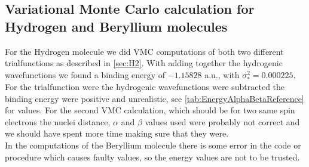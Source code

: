 
\subsection{Variational Monte Carlo calculation for Hydrogen and Beryllium molecules}
	For the Hydrogen molecule we did VMC computations of both two different trialfunctions as described in \cref{sec:H2}. With adding together the hydrogenic wavefunctions we found a binding energy of \(-1.15828\) a.u., with \(\sigma^2_* = 0.000225\). For the trialfunction were the hydrogenic wavefunctions were subtracted the binding energy were positive and unrealistic, see \cref{tab:EnergyAlphaBetaReference} for values. For the second VMC calculation, which should be for two same spin electrons the nuclei distance, $\alpha$ and $\beta$ values used were probably not correct and we should have spent more time making sure that they were. 
	\\
	\noindent
	In the computations of the Beryllium molecule there is some error in the code or procedure which causes faulty values, so the energy values are not to be trusted.